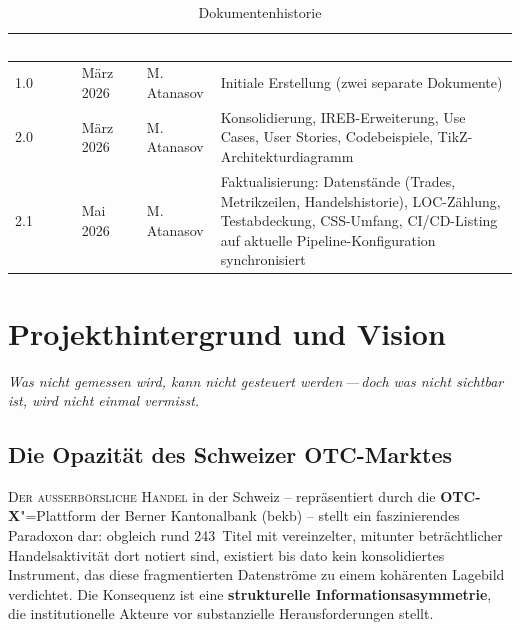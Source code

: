 \documentclass[11pt, a4paper, oneside, openany]{report}
\newcommand{\term}[1]{\textcolor{SwissRed}{\textsf{\textbf{#1}}}}
\begin{document}
\vspace{1cm}
\begin{table}[H]
\centering
\caption{Dokumentenhistorie}
\sffamily\small
{}
\begin{tabularx}{\textwidth}{l l l X}
  \toprule
  \rowcolor{DeepNavy} \textcolor{white}{\textbf{Version}} & \textcolor{white}{\textbf{Datum}} & \textcolor{white}{\textbf{Autor}} & \textcolor{white}{\textbf{Änderung}} \\
  \midrule
  1.0 & März 2026 & M.\,Atanasov & Initiale Erstellung (zwei separate Dokumente) \\
  2.0 & März 2026 & M.\,Atanasov & Konsolidierung, IREB-Erweiterung, Use Cases, User Stories, Codebeispiele, TikZ-Architekturdiagramm \\
  2.1 & Mai 2026  & M.\,Atanasov & Faktualisierung: Datenstände (Trades, Metrikzeilen, Handelshistorie), LOC-Zählung, Testabdeckung, CSS-Umfang, CI/CD-Listing auf aktuelle Pipeline-Konfiguration synchronisiert \\
  \bottomrule
\end{tabularx}
\end{table}

\tableofcontents
\clearpage
\listoftables
\clearpage
\listoffigures
\clearpage

\setcounter{page}{1}

\chapter{Projekthintergrund und Vision}
\label{ch:hintergrund}

\epigraph{\itshape Was nicht gemessen wird, kann nicht gesteuert werden\,---\,doch was nicht sichtbar ist, wird nicht einmal vermisst.}{}

\section{Die Opazität des Schweizer OTC-Marktes}

\lettrine[lines=3, lraise=0.1, findent=3pt, nindent=0pt]{\textcolor{SwissRed}{D}}{er ausserbörsliche Handel} in der Schweiz -- repräsentiert durch die \term{OTC-X}"=Plattform der Berner Kantonalbank (\gls{bekb}) -- stellt ein faszinierendes Paradoxon dar: obgleich rund 243~Titel mit vereinzelter, mitunter beträchtlicher Handelsaktivität dort notiert sind, existiert bis dato kein konsolidiertes Instrument, das diese fragmentierten Datenströme zu einem kohärenten Lagebild verdichtet. Die Konsequenz ist eine \textbf{strukturelle Informationsasymmetrie}, die institutionelle Akteure vor substanzielle Herausforderungen stellt.
\end{document}
